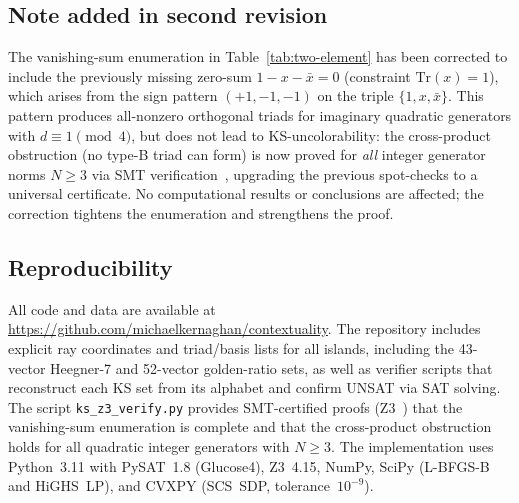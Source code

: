 \documentclass[12pt,a4paper]{article}
\begin{document}
\subsection*{Note added in second revision}

The vanishing-sum enumeration in Table~\ref{tab:two-element} has been corrected to include the previously missing zero-sum $1 - x - \bar{x} = 0$ (constraint $\mathrm{Tr}(x) = 1$), which arises from the sign pattern $(+1, -1, -1)$ on the triple $\{1, x, \bar{x}\}$.  This pattern produces all-nonzero orthogonal triads for imaginary quadratic generators with $d \equiv 1 \pmod{4}$, but does not lead to KS-uncolorability: the cross-product obstruction (no type-B triad can form) is now proved for \emph{all} integer generator norms $N \geq 3$ via SMT verification~\cite{deMouraBjorner2008}, upgrading the previous spot-checks to a universal certificate.  No computational results or conclusions are affected; the correction tightens the enumeration and strengthens the proof.

\subsection*{Reproducibility}

\begin{sloppypar}
All code and data are available at
\url{https://github.com/michaelkernaghan/contextuality}.
The repository includes explicit ray coordinates and triad/basis lists for all islands, including the 43-vector Heegner-7 and 52-vector golden-ratio sets, as well as verifier scripts that reconstruct each KS set from its alphabet and confirm UNSAT via SAT solving. The script \texttt{ks\_z3\_verify.py} provides SMT-certified proofs (Z3~\cite{deMouraBjorner2008}) that the vanishing-sum enumeration is complete and that the cross-product obstruction holds for all quadratic integer generators with $N \geq 3$. The implementation uses Python~3.11 with PySAT~1.8 (Glucose4), Z3~4.15, NumPy, SciPy (L-BFGS-B and HiGHS~LP), and CVXPY (SCS~SDP, tolerance~$10^{-9}$).
\end{sloppypar}
\end{document}
